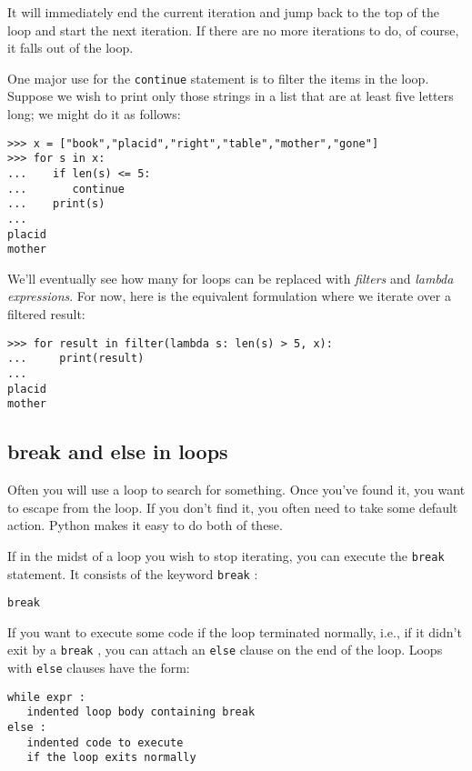 It will immediately end the current
iteration and jump back to the top of the loop and start the next
iteration. If there are no more iterations to do, of course, it falls
out of the loop.

One major use for the
\texttt{continue} statement is to filter the items in the loop. Suppose we
wish to print only those strings in a list that are at least five
letters long; we might do it as follows:


\begin{verbatim}
>>> x = ["book","placid","right","table","mother","gone"]
>>> for s in x:
...    if len(s) <= 5:
...       continue
...    print(s)
...
placid
mother  
\end{verbatim}

We'll eventually see how many for loops can be replaced with \emph{filters} and \emph{lambda expressions}.
For now, here is the equivalent formulation where we iterate over a filtered result:

\begin{verbatim}
>>> for result in filter(lambda s: len(s) > 5, x):
...     print(result)
...
placid
mother  
\end{verbatim}

\subsection{break and else in loops}
\label{break-and-else-in-loops}

Often you will use a loop to search
for something. Once you've found it, you want to escape from the loop.
If you don't find it, you often need to take some default action. Python
makes it easy to do both of these.

If in the midst of a loop you wish
to stop iterating, you can execute the \texttt{break} statement. It
consists of the keyword \texttt{break} :

\begin{verbatim}
break  
\end{verbatim}

If you want to execute some code if
the loop terminated normally, i.e., if it didn't exit by a \texttt{break}
, you can attach an \texttt{else} clause on the end of the loop. Loops
with \texttt{else} clauses have the form:

\begin{verbatim}
while expr :
   indented loop body containing break 
else :
   indented code to execute
   if the loop exits normally
\end{verbatim}

